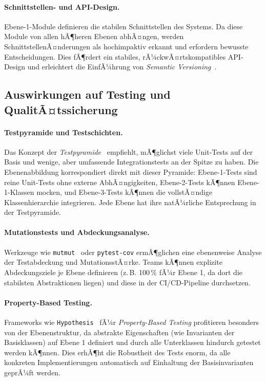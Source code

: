 ﻿\documentclass[a4paper,12pt]{article}
\begin{document}
\paragraph{Schnittstellen- und API-Design.}
Ebene-1-Module definieren die stabilen Schnittstellen des Systems. Da diese
Module von allen hÃ¶heren Ebenen abhÃ¤ngen, werden SchnittstellenÃ¤nderungen als
hochimpaktiv erkannt und erfordern bewusste Entscheidungen. Dies fÃ¶rdert ein
stabiles, rÃ¼ckwÃ¤rtskompatibles API-Design und erleichtert die EinfÃ¼hrung von
\textit{Semantic Versioning}~\cite{semver2024}.

\subsection{Auswirkungen auf Testing und QualitÃ¤tssicherung}

\paragraph{Testpyramide und Testschichten.}
Das Konzept der \textit{Testpyramide}~\cite{fowler2012} empfiehlt, mÃ¶glichst
viele Unit-Tests auf der Basis und wenige, aber umfassende Integrationstests
an der Spitze zu haben. Die Ebenenabbildung korrespondiert direkt mit dieser
Pyramide: Ebene-1-Tests sind reine Unit-Tests ohne externe AbhÃ¤ngigkeiten,
Ebene-2-Tests kÃ¶nnen Ebene-1-Klassen mocken, und Ebene-3-Tests kÃ¶nnen die
vollstÃ¤ndige Klassenhierarchie integrieren. Jede Ebene hat ihre natÃ¼rliche
Entsprechung in der Testpyramide.

\paragraph{Mutationstests und Abdeckungsanalyse.}
Werkzeuge wie \texttt{mutmut}~\cite{mutmut2024} oder \texttt{pytest-\newline cov}
ermÃ¶glichen eine ebenenweise Analyse der Testabdeckung und MutationsstÃ¤rke.
Teams kÃ¶nnen explizite Abdeckungsziele je Ebene definieren (z.\,B. 100\,\%
fÃ¼r Ebene 1, da dort die stabilsten Abstraktionen liegen) und diese in der
CI/CD-Pipeline durchsetzen.

\paragraph{Property-Based Testing.}
Frameworks wie \texttt{Hypothesis}~\cite{hypothesis2024} fÃ¼r
\textit{Property-Based Testing} profitieren besonders von der Ebenenstruktur,
da abstrakte Eigenschaften (wie Invarianten der Basisklassen) auf Ebene 1
definiert und durch alle Unterklassen hindurch getestet werden kÃ¶nnen. Dies
erhÃ¶ht die Robustheit des Tests enorm, da alle konkreten Implementierungen
automatisch auf Einhaltung der Basisinvarianten geprÃ¼ft werden.
\end{document}
